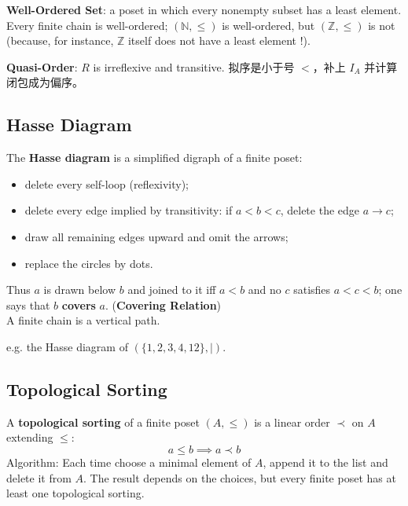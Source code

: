 \documentclass[12pt, a4paper, UTF8, openany]{ctexbook}
\newcommand{\field}[1]{\mathbb{#1}}%
\begin{document}
        \textbf{Well-Ordered Set}: a poset in which every nonempty subset has a least element. \\
        Every finite chain is well-ordered; $(\field{N}, \le)$ is well-ordered, but $(\field{Z}, \le)$ is not (because, for instance, $\field{Z}$ itself does not have a least element !).

        \textbf{Quasi-Order}: $R$ is irreflexive and transitive. 拟序是小于号 $<$，补上 $I_A$ 并计算闭包成为偏序。

        \subsection{Hasse Diagram}
            The \textbf{Hasse diagram} is a simplified digraph of a finite poset:
            \begin{itemize}
                \item delete every self-loop (reflexivity);
                \item delete every edge implied by transitivity: if $a < b < c$, delete the edge $a \to c$;
                \item draw all remaining edges upward and omit the arrows;
                \item replace the circles by dots.
            \end{itemize}
            Thus $a$ is drawn below $b$ and joined to it iff $a < b$ and no $c$ satisfies $a < c < b$; one says that $b$ \textbf{covers} $a$. (\textbf{Covering Relation})\\
            A finite chain is a vertical path.

            \begin{center}
            \end{center}
            e.g. the Hasse diagram of $(\{1, 2, 3, 4, 12\}, \mid)$.

        \subsection{Topological Sorting}
            A \textbf{topological sorting} of a finite poset $(A, \le)$ is a linear order $\prec$ on $A$ extending $\le$:
            $$ a \leqslant b \implies a \prec b $$
            Algorithm: Each time choose a minimal element of $A$, append it to the list and delete it from $A$.
            The result depends on the choices, but every finite poset has at least one topological sorting.
\end{document}
